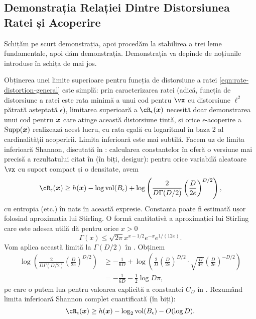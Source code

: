 \documentclass[../../book-main_ro.tex]{subfiles}
\begin{document}
\subsection{Demonstrația Relației Dintre Distorsiunea Ratei și Acoperire}

Schițăm pe scurt demonstrația, apoi procedăm la stabilirea a trei leme
fundamentale, apoi dăm demonstrația. Demonstrația va depinde de noțiunile introduse în
schița de mai jos.

Obținerea unei limite superioare pentru funcția de distorsiune a ratei
\eqref{eqn:rate-distortion-general} este simplă: prin caracterizarea ratei
(adică, funcția de distorsiune a ratei este rata minimă a
unui cod pentru $\vx$ cu distorsiune $\ell^2$ pătrată așteptată $\epsilon$), limitarea
superioară a $\cR_{\epsilon}(\x)$ necesită doar demonstrarea unui cod pentru $\bm{x}$ care
atinge această distorsiune țintă, și orice $\epsilon$-acoperire a $\operatorname{Supp}(\bm{x})$
realizează acest lucru, cu rata egală cu logaritmul în baza 2 al cardinalității
acoperirii.
Limita inferioară este mai subtilă. Facem uz de limita inferioară Shannon,
discutată în : calcularea constantelor în \cite[\S III,
(22)]{Linder1994-ej} oferă o versiune mai precisă a rezultatului citat în
 (în biți, desigur): pentru orice variabilă aleatoare $\vx$ cu suport
compact și o densitate, avem
\begin{equation}\label{eq:slb-appendix-1}
    \cR_{\epsilon}(\x)
    \geq
    h(\x)
    - \log \volume(B_{\epsilon})
    +
    \log
    \left(
    \frac{
    	2
    }
    {
    	D \Gamma(D/2)
    }
    \left(
    \frac{
    	D
    }
    {
    	2e
    }
    \right)^{D/2}
    \right),
\end{equation}
cu entropia (etc.) în nats în această expresie.
Constanta poate fi estimată ușor folosind aproximația lui Stirling.
O formă cantitativă a aproximației lui Stirling care este adesea utilă dă
pentru orice $x > 0$ \cite{Jameson2015-hy}
\begin{equation}
    \Gamma(x) \leq \sqrt{2\pi} x^{x - 1/2} e^{-x} e^{1/(12x)}.
\end{equation}
Vom aplica această limită la $\Gamma(D/2)$ în .
Obținem
\begin{align}
    \log
    \left(
    \frac{
        2
    }
    {
        D \Gamma(D/2)
    }
    \left(
    \frac{
        D
    }
    {
        2e
    }
    \right)^{D/2}
    \right)
    &\geq
    -\frac{1}{6D}
    +
    \log\left(
        \frac{2}{D} 
        \left(
        \frac{
            D
        }
        {
            2e
        }
        \right)^{D/2}
        \cdot
        \sqrt{\frac{D}{4\pi}}
        \left(
        \frac{D}{2e}
        \right)^{-D/2}
    \right)
    \\
    &=
    -\frac{1}{6D}
    - \frac{1}{2}\log D\pi,\label{eq:slb-constant-est}
\end{align}
pe care o putem lua pentru valoarea explicită a constantei $C_D$ în .
Rezumând limita inferioară Shannon complet cuantificată (în biți):
\begin{equation}\label{eq:slb-appendix}
    \cR_{\epsilon}(\x)
    \geq
    h(\x)
    - \log_2 \volume(B_{\epsilon})
    - O(\log D).
\end{equation}
\end{document}

